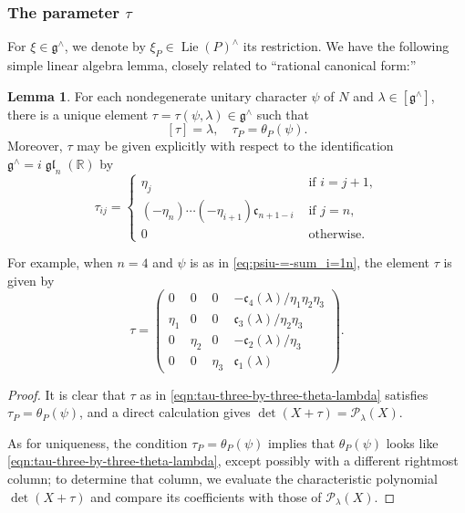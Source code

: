 \documentclass[reqno]{amsart}
\DeclareMathOperator{\glLie}{\mathfrak{g}\mathfrak{l}}
\DeclareMathOperator{\Lie}{Lie}
\theoremstyle{plain} \newtheorem{theorem} {Theorem}
\theoremstyle{definition} \newtheorem{definition} [theorem] {Definition}
\theoremstyle{itplain} %
\newtheorem{lemma}[theorem]{Lemma}
\numberwithin{equation}{section}
\numberwithin{theorem}{section}
\begin{document}
\subsubsection{The parameter $\tau$}\label{sec:parameter-tau}
For $\xi \in \mathfrak{g}^\wedge$, we denote by $\xi_P \in \Lie(P)^\wedge$ its restriction.  We have the following simple linear algebra lemma, closely related to ``rational canonical form:''
\begin{lemma}\label{lem:construction-tau-from-theta}
  For each nondegenerate unitary character $\psi$ of $N$ and $\lambda \in [\mathfrak{g}^\wedge]$, there is a unique element $\tau = \tau(\psi,\lambda) \in \mathfrak{g}^\wedge$ such that 
  \[
    [\tau] = \lambda, \quad \tau_P = \theta_P(\psi).
  \]
  Moreover, $\tau$ may be given explicitly with respect to the identification $\mathfrak{g}^\wedge = i \glLie_n(\mathbb{R})$ by
  \[
    \tau_{i j} =
    \begin{cases}
      \eta_j   & \text{ if } i = j+1, \\
      (-\eta_n) \dotsb (-\eta_{i+1}) \mathfrak{c}_{n+1-i}
      & \text{ if } j = n, \\
      0 & \text{ otherwise}.
    \end{cases}
  \]
\end{lemma}
For example, when $n=4$ and $\psi$ is as in \eqref{eq:psiu-=-sum_i=1n}, the element $\tau$ is given by
\begin{equation}\label{eqn:tau-three-by-three-theta-lambda}
  \tau
  =
  \begin{pmatrix}
    0 & 0 & 0 &  - \mathfrak{c}_4(\lambda)  / \eta_1 \eta_2 \eta_3 \\
    \eta_1  & 0 & 0 & \mathfrak{c}_3(\lambda)  / \eta_2 \eta_3\\
    0 & \eta_2 & 0 & -\mathfrak{c}_2(\lambda)/ \eta_3 \\
    0 & 0 & \eta_3 & \mathfrak{c}_1(\lambda)
  \end{pmatrix}.
\end{equation}
\begin{proof}
  It is clear that $\tau$ as in \eqref{eqn:tau-three-by-three-theta-lambda} satisfies $\tau_P = \theta_P(\psi)$, and a direct calculation gives $\det(X + \tau) = \mathcal{P}_\lambda(X)$.

  As for uniqueness, the condition $\tau_P = \theta_P(\psi)$ implies that $\theta_P(\psi)$ looks like \eqref{eqn:tau-three-by-three-theta-lambda}, except possibly with a different rightmost column; to determine that column, we evaluate the characteristic polynomial $\det(X + \tau)$ and compare its coefficients with those of $\mathcal{P}_\lambda(X)$.
\end{proof}
\end{document}
